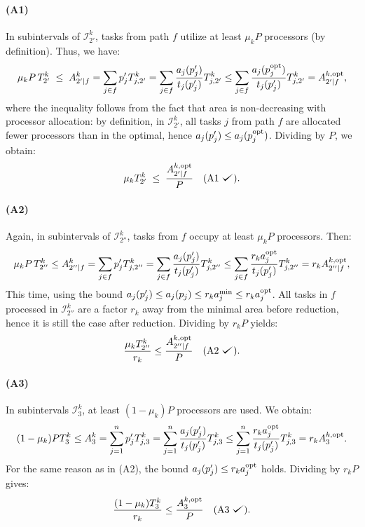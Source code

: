 \documentclass{article}
\def\checkmark{\tikz\fill[scale=0.4](0,.35) -- (.25,0) -- (1,.7) -- (.25,.15) -- cycle;}
\newcommand\rratio{r\xspace}
\newcommand\opt{\textnormal{opt}\xspace}
\begin{document}
\paragraph{(A1)} In subintervals of $\mathcal{I}_{2'}^k$, tasks from path $f$ utilize at least $\mu_k P$ processors (by definition). Thus, we have:
\[
\mu_k P\, T_{2'}^k \;\le\; A_{2'|f}^{k} = \sum_{j \in f} p'_j T_{j,2'}^k = \sum_{j \in f} \frac{a_j(p'_j)}{t_j(p'_j)}T_{j,2'}^k \le \sum_{j \in f}\frac{a_j(p_j^{\opt})}{t_j(p'_j)}T_{j,2'}^k = A_{2'|f}^{k,\opt},
\]
where the inequality follows from the fact that area is non-decreasing with processor allocation: by definition, in $\mathcal{I}_{2'}^k$, all tasks $j$ from path $f$ are allocated fewer processors than in the optimal, hence \(a_j(p'_j) \le a_j(p_j^{\opt})\). Dividing by \(P\), we obtain:
\[
\mu_k T_{2'}^k \;\le\; \frac{A_{2'|f}^{k,\opt}}{P} \quad \text{(A1 \checkmark)}.
\]

\paragraph{(A2)} Again, in subintervals of $\mathcal{I}_{2''}^k$, tasks from $f$ occupy at least $\mu_k P$ processors. Then:
\[
\mu_k P\, T_{2''}^k \le A_{2''|f}^{k} = \sum_{j \in f} p'_j T_{j,2''}^k = \sum_{j \in f} \frac{a_j(p'_j)}{t_j(p'_j)}T_{j,2''}^k \le \sum_{j \in f} \frac{\rratio_k  a_j^{\opt}}{t_j(p'_j)} T_{j,2''}^k = \rratio_k A_{2''|f}^{k,\opt},
\]
This time, using the bound \(a_j(p'_j) \le a_j(p_j) \le \rratio_k a_j^{\min} \le \rratio_k a_j^{\opt}\). All tasks in $f$ processed in $\mathcal{I}_{2''}^k$ are a factor $\rratio_k$ away from the minimal area before reduction, hence it is still the case after reduction. Dividing by \(\rratio_k P\) yields:
\[
\frac{\mu_k T_{2''}^k}{\rratio_k} \le \frac{A_{2''|f}^{k,\opt}}{P} \quad \text{(A2 \checkmark)}.
\]

\paragraph{(A3)} In subintervals $\mathcal{I}_{3}^k$, at least $(1 - \mu_k)P$ processors are used. We obtain:
\[
(1-\mu_k)P T_3^k \le A_3^k = \sum_{j=1}^{n} p'_j T_{j,3}^k = \sum_{j=1}^{n} \frac{a_j(p'_j)}{t_j(p'_j)}T_{j,3}^k \le  \sum_{j=1}^{n} \frac{\rratio_k a_j^{\opt}}{t_j(p'_j)} T_{j,3}^k = \rratio_k A_3^{k,\opt}.
\]
For the same reason as in (A2), the bound \(a_j(p'_j) \le \rratio_k a_j^{\opt}\) holds. Dividing by $\rratio_k P$ gives:
\[
\frac{(1 - \mu_k) T_3^k}{\rratio_k} \le \frac{A_3^{k,\opt}}{P} \quad \text{(A3 \checkmark)}.
\]
\end{document}
